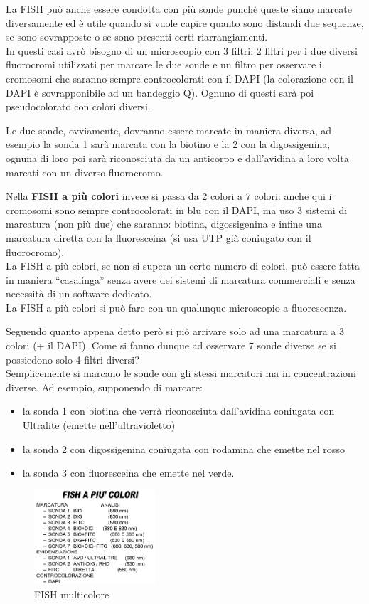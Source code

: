\documentclass[11pt]{book}
\begin{document}
La FISH può anche essere condotta con più sonde punchè queste siano marcate diversamente ed è utile quando si vuole capire quanto sono distandi due sequenze, se sono sovrapposte o se sono presenti certi riarrangiamenti.\\
In questi casi avrò bisogno di un microscopio con 3 filtri: 2 filtri per i due diversi fluorocromi utilizzati per marcare le due sonde e un filtro per osservare i cromosomi che saranno sempre controcolorati con il DAPI (la colorazione con il DAPI è sovrapponibile ad un bandeggio Q).
Ognuno di questi sarà poi pseudocolorato con colori diversi.

Le due sonde, ovviamente, dovranno essere marcate in maniera diversa, ad esempio la sonda 1 sarà marcata con la biotino e la 2 con la digossigenina, ognuna di loro poi sarà riconosciuta da un anticorpo e dall'avidina a loro volta marcati con un diverso fluorocromo.

Nella \textbf{FISH a più colori} invece si passa da 2 colori a 7 colori: anche qui i cromosomi sono sempre controcolorati in blu con il DAPI, ma uso 3 sistemi di marcatura (non più due) che saranno: biotina, digossigenina e infine una marcatura diretta con la fluoresceina (si usa UTP già coniugato con il fluorocromo).\\
La FISH a più colori, se non si supera un certo numero di colori, può essere fatta in maniera ``casalinga'' senza avere dei sistemi di marcatura commerciali e senza necessità di un software dedicato.\\
La FISH a più colori si può fare con un qualunque microscopio a fluorescenza.

Seguendo quanto appena detto però si piò arrivare solo ad una marcatura a 3 colori (+ il DAPI). Come si fanno dunque ad osservare 7 sonde diverse se si possiedono solo 4 filtri diversi?\\
Semplicemente si marcano le sonde con gli stessi marcatori ma in concentrazioni diverse. Ad esempio, supponendo di marcare:
\begin{itemize}
\item la sonda 1 con biotina che verrà riconosciuta dall'avidina coniugata con Ultralite (emette nell'ultravioletto)
\item la sonda 2 con digossigenina coniugata con rodamina che emette nel rosso
\item la sonda 3 con fluoresceina che emette nel verde.
\end{itemize}

\begin{figure}
    \includegraphics[width=0.4\textwidth]{img/40_fish_multicolore.png}
  \caption{FISH multicolore}
\end{figure}
\end{document}

